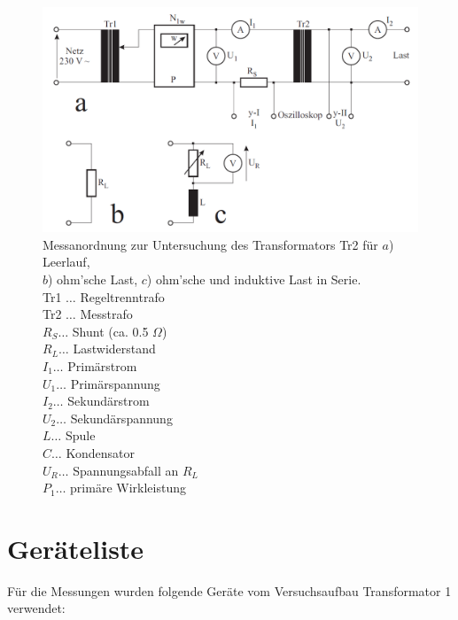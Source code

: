 \documentclass[11pt,ngerman]{scrartcl}
\begin{document}
\begin{figure}[H]
	\begin{center}
		\includegraphics[width=\textwidth]{abb9}
	\end{center}
	\caption{Messanordnung zur Untersuchung des Transformators Tr2 für $a$) Leerlauf, \\
		$b$) ohm’sche Last, $c$) ohm’sche und induktive Last in Serie. \\
		Tr1 $\dots$ Regeltrenntrafo \\
		Tr2 $\dots$ Messtrafo \\
		$R_S \dots$ Shunt (ca. 0.5 $\Omega$) \\
		$R_L \dots$ Lastwiderstand \\
		$I_1 \dots$ Primärstrom \\
		$U_1 \dots$ Primärspannung \\
		$I_2 \dots$ Sekundärstrom \\
		$U_2 \dots$ Sekundärspannung \\
		$L \dots$ Spule \\
		$C \dots$ Kondensator \\
		$U_R \dots$ Spannungsabfall an $R_L$ \\
		$P_1 \dots$ primäre Wirkleistung}
	\label{fig:abb9}
\end{figure}


\newpage

\section{Geräteliste}

\noindent Für die Messungen wurden folgende Geräte vom Versuchsaufbau Transformator 1 verwendet:
\end{document}
